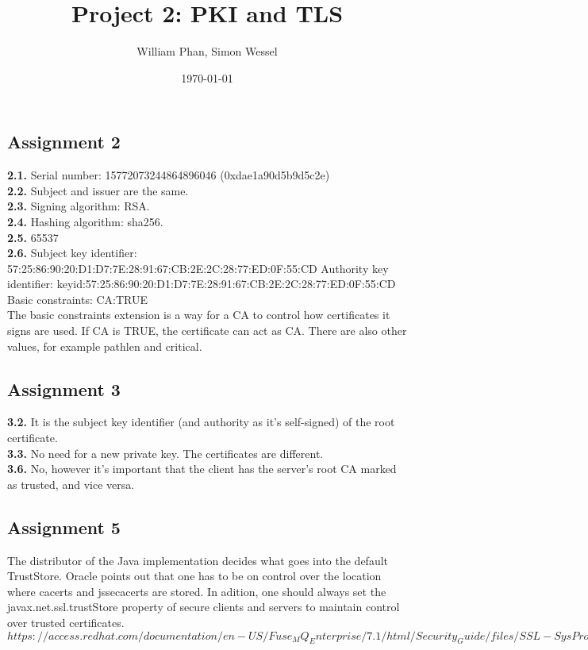 \documentclass[11pt,a4paper]{article}
\title{Project 2: PKI and TLS} %
\author{William Phan, Simon Wessel}
\date{\today} %
\begin{document}
\maketitle %

\setcounter{secnumdepth}{0}

\subsection{Assignment 2}
\textbf{2.1.} Serial number: 15772073244864896046 (0xdae1a90d5b9d5c2e)\\
\textbf{2.2.} Subject and issuer are the same.\\
\textbf{2.3.} Signing algorithm: RSA.\\
\textbf{2.4.} Hashing algorithm: sha256.\\
\textbf{2.5.} 65537\\
\textbf{2.6.} Subject key identifier:
     57:25:86:90:20:D1:D7:7E:28:91:67:CB:2E:2C:28:77:ED:0F:55:CD\newline
     \indent Authority key identifier:
     keyid:57:25:86:90:20:D1:D7:7E:28:91:67:CB:2E:2C:28:77:ED:0F:55:CD\\
     Basic constraints:
     CA:TRUE\\
     The basic constraints extension is a way for a CA to control how certificates it signs are used. If CA is TRUE, the certificate can act as CA. There are also other values, for example pathlen and critical.
     
\subsection{Assignment 3}
\textbf{3.2.} It is the subject key identifier (and authority as it's self-signed) of the root certificate.\\
\textbf{3.3.} No need for a new private key. The certificates are different.\\
\textbf{3.6.} No, however it's important that the client has the server's root CA marked as trusted, and vice versa.

\subsection{Assignment 5}
The distributor of the Java implementation decides what goes into the default TrustStore. Oracle points out that one has to be on control over the location where cacerts and jssecacerts are stored. In adition, one should always set the javax.net.ssl.trustStore property of secure clients and servers to maintain control over trusted certificates.
\\{\scriptsize$https://access.redhat.com/documentation/en-US/Fuse_MQ_Enterprise/7.1/html/Security_Guide/files/SSL-SysProps.html$}
\end{document}
